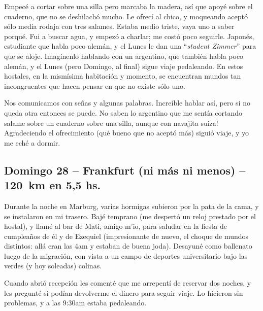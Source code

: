 Empec\'e a cortar sobre una silla pero marcaba la madera, as\'i que apoy\'e
sobre el cuaderno, que no se deshilach\'o mucho. Le ofrec\'i al chico, y
moqueando acept\'o s\'olo media rodaja con tres salames. Estaba medio triste,
vaya uno a saber porqu\'e. Fui a buscar agua, y empez\'o a charlar; me cost\'o
poco seguirle. Japon\'es, estudiante que habla poco alem\'an, y el Lunes le
dan una ``\emph{student Zimmer}'' para que se aloje. Imag\'inenlo hablando con
un argentino, que tambi\'en habla poco alem\'an, y el Lunes (pero Domingo, al
final) sigue viaje pedaleando. En estos hostales, en la mism\'isima habitaci\'on
y momento, se encuentran mundos tan incongruentes que hacen pensar en que no
existe s\'olo uno.

Nos comunicamos con se\~nas y algunas palabras. Incre\'ible hablar as\'i, pero
si no queda otra entonces se puede. \textexclamdown No saben lo argentino que
me sent\'ia cortando salame sobre un cuaderno sobre una silla, aunque con
navajita suiza! Agradeciendo el ofrecimiento (qu\'e bueno que no acept\'o
m\'as) sigui\'o viaje, y yo me ech\'e a dormir.

\subsection*{Domingo 28 -- Frankfurt {\small (ni m\'as ni menos)} -- 120~km en
5,5 hs.}

Durante la noche en Marburg, varias hormigas subieron por la pata de la cama,
y se instalaron en mi trasero. Baj\'e temprano (me despert\'o un reloj
prestado por el hostal), y llam\'e al bar de Mati, amigo m'io, para saludar en
la fiesta de cumplea\~nos de \'el y de Ezequiel (impresionante de nuevo, el
choque de mundos distintos: all\'a eran las 4am y estaban de buena joda).
Desayun\'e como ballenato luego de la migraci\'on, con vista a un campo de
deportes universitario bajo las verdes (y hoy soleadas) colinas.

Cuando abri\'o recepci\'on les coment\'e que me arrepent\'i de reservar dos
noches, y les pregunt\'e si pod\'ian devolverme el dinero para seguir viaje.
Lo hicieron sin problemas, y a las 9:30am estaba pedaleando.

